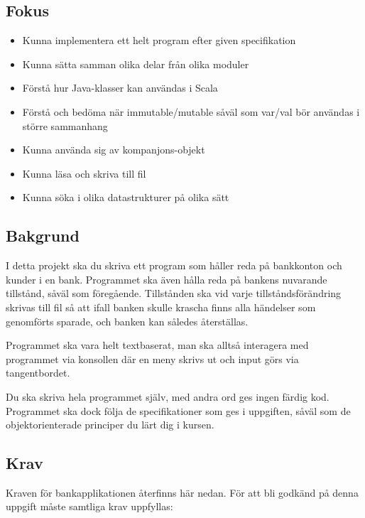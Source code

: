 

\subsection{Fokus}
\begin{itemize}[nosep,label={$\square$},leftmargin=*]
\item Kunna implementera ett helt program efter given specifikation
\item Kunna sätta samman olika delar från olika moduler
\item Förstå hur Java-klasser kan användas i Scala
\item Förstå och bedöma när immutable/mutable såväl som var/val bör användas i större sammanhang
\item Kunna använda sig av kompanjons-objekt
\item Kunna läsa och skriva till fil
\item Kunna söka i olika datastrukturer på olika sätt
\end{itemize}

\subsection{Bakgrund}

I detta projekt ska du skriva ett program som håller reda på bankkonton och kunder i en bank. Programmet ska även hålla reda på bankens nuvarande tillstånd, såväl som föregående.
Tillstånden ska vid varje tillståndsförändring skrivas till fil så att ifall banken skulle krascha finns alla händelser som genomförts sparade, och banken kan således återställas.

Programmet ska vara helt textbaserat, man ska alltså interagera med programmet via konsollen där en meny skrivs ut och input görs via tangentbordet.

Du ska skriva hela programmet själv, med andra ord ges ingen färdig kod. Programmet ska dock följa de specifikationer som ges i uppgiften, såväl som de objektorienterade principer du lärt dig i kursen.

\subsection{Krav}

Kraven för bankapplikationen återfinns här nedan. För att bli godkänd på denna uppgift måste samtliga krav uppfyllas:


